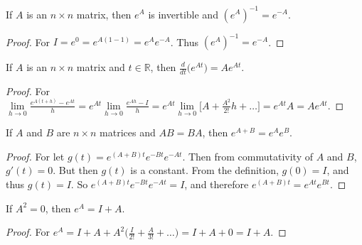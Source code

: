 \documentclass[crop=false,class=book,oneside]{standalone}                      %
\begin{document}
        \begin{theorem}
        If $A$ is an $n\times n$ matrix, then $e^A$ is invertible and $(e^A)^{-1} = e^{-A}$.
        \end{theorem}
        \begin{proof}
        For $I = e^{0} = e^{A(1-1)} = e^Ae^{-A}$. Thus $(e^{A})^{-1} = e^{-A}$.
        \end{proof}
        \begin{theorem}
        If $A$ is an $n\times n$ matrix and $t\in \mathbb{R}$, then $\frac{d}{dt}\big(e^{At}\big) = Ae^{At}$.
        \end{theorem}
        \begin{proof}
        For $\underset{h\rightarrow 0}\lim \frac{e^{A(t+h)}-e^{At}}{h} = e^{At}\underset{h\rightarrow 0}\lim \frac{e^{Ah}-I}{h} = e^{At}\underset{h\rightarrow 0}\lim\big[A+\frac{A^2}{2!}h+\hdots\big] = e^{At}A = Ae^{At}$.
        \end{proof}
        \begin{theorem}
        If $A$ and $B$ are $n\times n$ matrices and $AB=BA$, then $e^{A+B} = e^{A}e^{B}$.
        \end{theorem}
        \begin{proof}
        For let $g(t) = e^{(A+B)t}e^{-Bt}e^{-At}$. Then from commutativity of $A$ and $B$, $g'(t) = 0$. But then $g(t)$ is a constant. From the definition, $g(0) = I$, and thus $g(t) = I$. So $e^{(A+B)t}e^{-Bt}e^{-At} = I$, and therefore $e^{(A+B)t} = e^{At}e^{Bt}$.
        \end{proof}
        \begin{theorem}
        If $A^{2} = 0$, then $e^{A} = I+A$.
        \end{theorem}
        \begin{proof}
        For $e^{A} = I+A+A^{2}\big(\frac{I}{2!}+\frac{A}{3!}+\hdots\big) = I+A+0 = I+A$.
        \end{proof}
\end{document}
